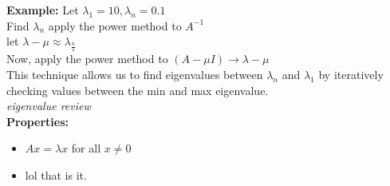 \documentclass[10pt, AMS Euler]{article}
\begin{document}
\textbf{Example:} Let $\lambda_1 = 10, \lambda_n = 0.1$\\
Find $\lambda_n$ apply the power method to $A^{-1}$\\

let $\lambda - \mu \approx \lambda_{\frac{n}{2}}$\\
Now, apply the power method to $(A - \mu I) \rightarrow \lambda - \mu$\\

This technique allows us to find eigenvalues between $\lambda_n$ and $\lambda_1$ by iteratively checking values between the min and max eigenvalue.\\

\textit{eigenvalue review}\\

\textbf{Properties:}\\
\begin{itemize}
  \item $Ax = \lambda x$ for all $x \neq 0$
  \item lol that is it. 
\end{itemize}

\noindent \underline{\hspace{3in}}\\
\end{document}
